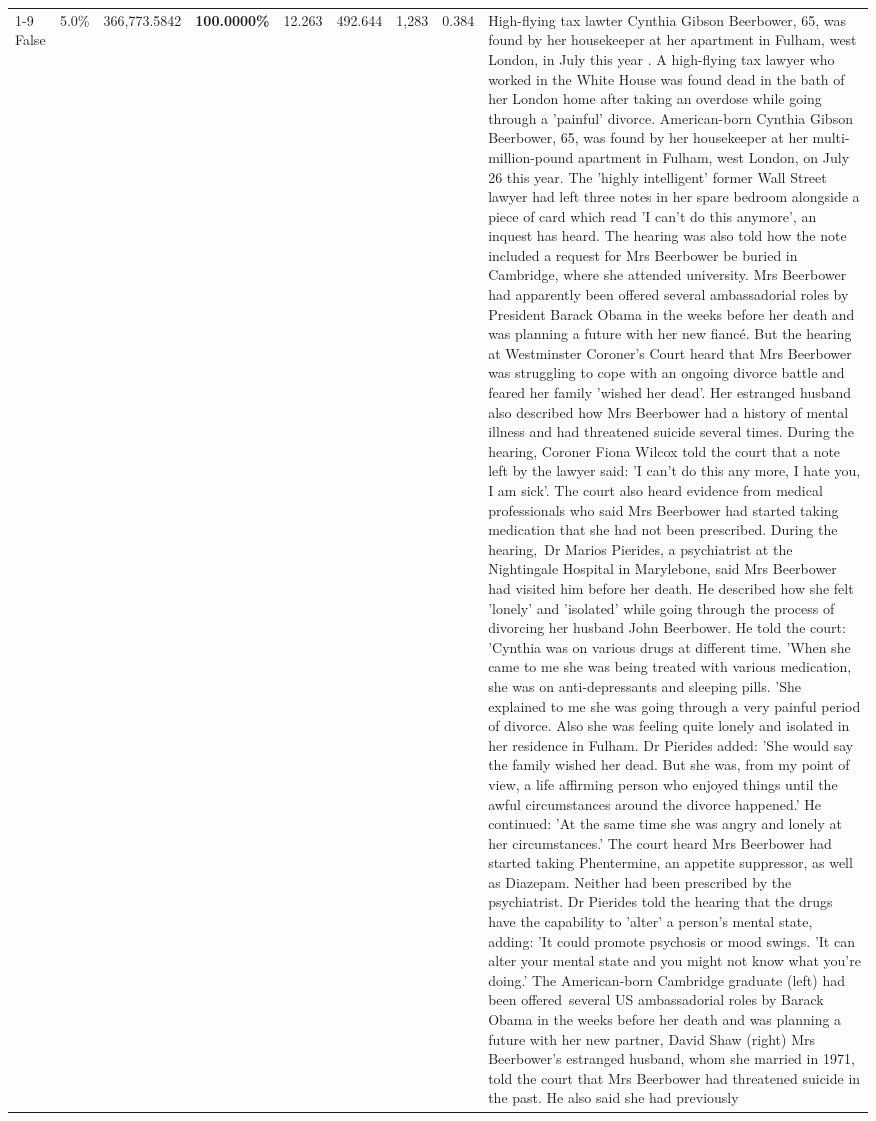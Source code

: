 \begin{table}[H]
\begin{tabular}{lllrlllll}
\cline{1-9}
False & 5.0\% & 366,773.5842 & \bfseries \color{red} 100.0000\% & 12.263 & 492.644 & 1,283 & 0.384 & High-flying tax lawter Cynthia Gibson Beerbower, 65, was found by her housekeeper at her apartment in Fulham, west London, in July this year . A high-flying tax lawyer who worked in the White House was found dead in the bath of her London home after taking an overdose while going through a 'painful' divorce. American-born Cynthia Gibson Beerbower, 65, was found by her housekeeper at her multi-million-pound apartment in Fulham, west London, on July 26 this year. The 'highly intelligent' former Wall Street lawyer had left three notes in her spare bedroom alongside a piece of card which read 'I can't do this anymore', an inquest has heard. The hearing was also told how the note included a request for Mrs Beerbower be buried in Cambridge, where she attended university. Mrs Beerbower had apparently been offered several ambassadorial roles by President Barack Obama in the weeks before her death and was planning a future with her new fiancé. But the hearing at Westminster Coroner's Court heard that Mrs Beerbower was struggling to cope with an ongoing divorce battle and feared her family 'wished her dead'. Her estranged husband also described how Mrs Beerbower had a history of mental illness and had threatened suicide several times. During the hearing, Coroner Fiona Wilcox told the court that a note left by the lawyer said: 'I can't do this any more, I hate you, I am sick'. The court also heard evidence from medical professionals who said Mrs Beerbower had started taking medication that she had not been prescribed. During the hearing, Dr Marios Pierides, a psychiatrist at the Nightingale Hospital in Marylebone, said Mrs Beerbower had visited him before her death. He described how she felt 'lonely' and 'isolated' while going through the process of divorcing her husband John Beerbower. He told the court: 'Cynthia was on various drugs at different time. 'When she came to me she was being treated with various medication, she was on anti-depressants and sleeping pills. 'She explained to me she was going through a very painful period of divorce. Also she was feeling quite lonely and isolated in her residence in Fulham. Dr Pierides added: 'She would say the family wished her dead. But she was, from my point of view, a life affirming person who enjoyed things until the awful circumstances around the divorce happened.' He continued: 'At the same time she was angry and lonely at her circumstances.' The court heard Mrs Beerbower had started taking Phentermine, an appetite suppressor, as well as Diazepam. Neither had been prescribed by the psychiatrist. Dr Pierides told the hearing that the drugs have the capability to 'alter' a person's mental state, adding: 'It could promote psychosis or mood swings. 'It can alter your mental state and you might not know what you're doing.' The American-born Cambridge graduate (left) had been offered several US ambassadorial roles by Barack Obama in the weeks before her death and was planning a future with her new partner, David Shaw (right) Mrs Beerbower's estranged husband, whom she married in 1971, told the court that Mrs Beerbower had threatened suicide in the past. He also said she had previously 
\end{tabular}
\end{table}
